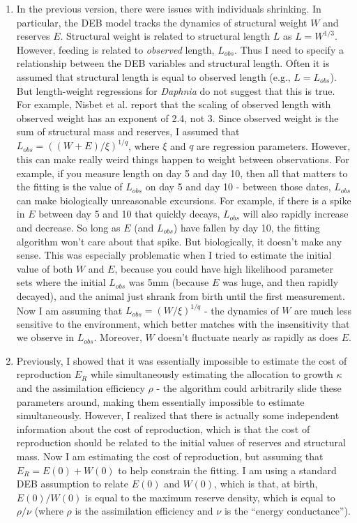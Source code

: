 \documentclass[12pt,reqno,final,pdftex]{amsart}\usepackage[]{graphicx}\usepackage[]{color}
\theoremstyle{plain}
\numberwithin{equation}{part}
\begin{document}
\begin{enumerate}
\item In the previous version, there were issues with individuals shrinking. In particular, the DEB model tracks the dynamics of structural weight $W$ and reserves $E$. Structural weight is related to structural length $L$ as $L = W^{1/3}$. However, feeding is related to \emph{observed} length, $L_{obs}$. Thus I need to specify a relationship between the DEB variables and structural length. Often it is assumed that structural length is equal to observed length (e.g., $L=L_{obs}$). But length-weight regressions for \emph{Daphnia} do not suggest that this is true. For example, Nisbet et al. report that the scaling of observed length with observed weight has an exponent of 2.4, not 3. Since observed weight is the sum of structural mass and reserves, I assumed that $L_{obs} = ((W+E)/\xi)^{1/q}$, where $\xi$ and $q$ are regression parameters. However, this can make really weird things happen to weight between observations. For example, if you measure length on day 5 and day 10, then all that matters to the fitting is the value of $L_{obs}$ on day 5 and day 10 - between those dates, $L_{obs}$ can make biologically unreasonable excursions. For example, if there is a spike in $E$ between day 5 and 10 that quickly decays, $L_{obs}$ will also rapidly increase and decrease. So long as $E$ (and $L_{obs}$) have fallen by day 10, the fitting algorithm won't care about that spike. But biologically, it doesn't make any sense. This was especially problematic when I tried to estimate the initial value of both $W$ and $E$, because you could have high likelihood parameter sets where the initial $L_{obs}$ was 5mm (because $E$ was huge, and then rapidly decayed), and the animal just shrank from birth until the first measurement. Now I am assuming that $L_{obs} = (W/\xi)^{1/q}$ - the dynamics of $W$ are much less sensitive to the environment, which better matches with the insensitivity that we observe in $L_{obs}$. Moreover, $W$ doesn't fluctuate nearly as rapidly as does $E$.
\item Previously, I showed that it was essentially impossible to estimate the cost of reproduction $E_R$ while simultaneously estimating the allocation to growth $\kappa$ and the assimilation efficiency $\rho$ - the algorithm could arbitrarily slide these parameters around, making them essentially impossible to estimate simultaneously. However, I realized that there is actually some independent information about the cost of reproduction, which is that the cost of reproduction should be related to the initial values of reserves and structural mass. Now I am estimating the cost of reproduction, but assuming that $E_R = E(0) + W(0)$ to help constrain the fitting. I am using a standard DEB assumption to relate $E(0)$ and $W(0)$, which is that, at birth, $E(0)/W(0)$ is equal to the maximum reserve density, which is equal to $\rho/\nu$ (where $\rho$ is the assimilation efficiency and $\nu$ is the ``energy conductance'').
\end{enumerate}
\end{document}
